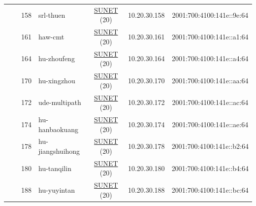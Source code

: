 \begin{small}
\begin{center}
\begin{longtable}{|c|c|c|c|c|c|c|c|}
  &  & \tiny{158} & \multicolumn{1}{|l|}{\tiny{srl-thuen}} & \multicolumn{2}{|c|}{\tiny{\href{http://www.sunet.se}{SUNET} (20)}} & \tiny{10.20.30.158} & \tiny{2001:700:4100:141e::9e:64} \\* \cline{3-3}\cline{4-4}\cline{5-5}\cline{6-6}\cline{7-7}\cline{8-8}
  &  & \tiny{161} & \multicolumn{1}{|l|}{\tiny{haw-cmt}} & \multicolumn{2}{|c|}{\tiny{\href{http://www.sunet.se}{SUNET} (20)}} & \tiny{10.20.30.161} & \tiny{2001:700:4100:141e::a1:64} \\* \cline{3-3}\cline{4-4}\cline{5-5}\cline{6-6}\cline{7-7}\cline{8-8}
  &  & \tiny{164} & \multicolumn{1}{|l|}{\tiny{hu-zhoufeng}} & \multicolumn{2}{|c|}{\tiny{\href{http://www.sunet.se}{SUNET} (20)}} & \tiny{10.20.30.164} & \tiny{2001:700:4100:141e::a4:64} \\* \cline{3-3}\cline{4-4}\cline{5-5}\cline{6-6}\cline{7-7}\cline{8-8}
  &  & \tiny{170} & \multicolumn{1}{|l|}{\tiny{hu-xingzhou}} & \multicolumn{2}{|c|}{\tiny{\href{http://www.sunet.se}{SUNET} (20)}} & \tiny{10.20.30.170} & \tiny{2001:700:4100:141e::aa:64} \\* \cline{3-3}\cline{4-4}\cline{5-5}\cline{6-6}\cline{7-7}\cline{8-8}
  &  & \tiny{172} & \multicolumn{1}{|l|}{\tiny{ude-multipath}} & \multicolumn{2}{|c|}{\tiny{\href{http://www.sunet.se}{SUNET} (20)}} & \tiny{10.20.30.172} & \tiny{2001:700:4100:141e::ac:64} \\* \cline{3-3}\cline{4-4}\cline{5-5}\cline{6-6}\cline{7-7}\cline{8-8}
  &  & \tiny{174} & \multicolumn{1}{|l|}{\tiny{hu-hanbaokuang}} & \multicolumn{2}{|c|}{\tiny{\href{http://www.sunet.se}{SUNET} (20)}} & \tiny{10.20.30.174} & \tiny{2001:700:4100:141e::ae:64} \\* \cline{3-3}\cline{4-4}\cline{5-5}\cline{6-6}\cline{7-7}\cline{8-8}
  &  & \tiny{178} & \multicolumn{1}{|l|}{\tiny{hu-jiangshuihong}} & \multicolumn{2}{|c|}{\tiny{\href{http://www.sunet.se}{SUNET} (20)}} & \tiny{10.20.30.178} & \tiny{2001:700:4100:141e::b2:64} \\* \cline{3-3}\cline{4-4}\cline{5-5}\cline{6-6}\cline{7-7}\cline{8-8}
  &  & \tiny{180} & \multicolumn{1}{|l|}{\tiny{hu-tanqilin}} & \multicolumn{2}{|c|}{\tiny{\href{http://www.sunet.se}{SUNET} (20)}} & \tiny{10.20.30.180} & \tiny{2001:700:4100:141e::b4:64} \\* \cline{3-3}\cline{4-4}\cline{5-5}\cline{6-6}\cline{7-7}\cline{8-8}
  &  & \tiny{188} & \multicolumn{1}{|l|}{\tiny{hu-yuyintan}} & \multicolumn{2}{|c|}{\tiny{\href{http://www.sunet.se}{SUNET} (20)}} & \tiny{10.20.30.188} & \tiny{2001:700:4100:141e::bc:64} \\ \hline

\end{longtable}
\end{center}
\end{small}

